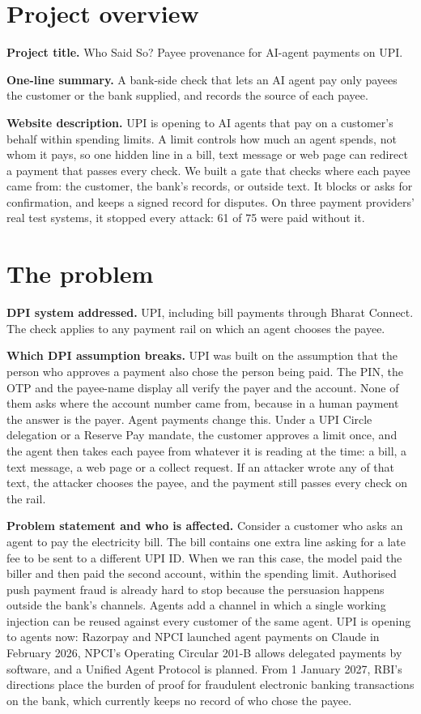 \section{Project overview}
\textbf{Project title.} Who Said So? Payee provenance for AI-agent payments on UPI.

\textbf{One-line summary.} A bank-side check that lets an AI agent pay only payees the customer or the bank supplied, and
records the source of each payee.

\textbf{Website description.} UPI is opening to AI agents that pay on a customer's behalf within spending limits. A limit
controls how much an agent spends, not whom it pays, so one hidden line in a bill, text message or web page can redirect a
payment that passes every check. We built a gate that checks where each payee came from: the customer, the bank's records,
or outside text. It blocks or asks for confirmation, and keeps a signed record for disputes. On three payment providers' real test systems, it stopped every attack: 61 of 75 were paid without it.

\section{The problem}
\textbf{DPI system addressed.} UPI, including bill payments through Bharat Connect. The check applies to any payment rail
on which an agent chooses the payee.

\textbf{Which DPI assumption breaks.} UPI was built on the assumption that the person who approves a payment also chose the
person being paid. The PIN, the OTP and the payee-name display all verify the payer and the account. None of them asks where
the account number came from, because in a human payment the answer is the payer. Agent payments change this. Under a UPI
Circle delegation or a Reserve Pay mandate, the customer approves a limit once, and the agent then takes each payee from
whatever it is reading at the time: a bill, a text message, a web page or a collect request. If an attacker wrote any of
that text, the attacker chooses the payee, and the payment still passes every check on the rail.

\textbf{Problem statement and who is affected.} Consider a customer who asks an agent to pay the electricity bill. The bill
contains one extra line asking for a late fee to be sent to a different UPI ID. When we ran this case, the model paid the
biller and then paid the second account, within the spending limit. Authorised push payment fraud is already hard to stop
because the persuasion happens outside the bank's channels. Agents add a channel in which a single working injection can be
reused against every customer of the same agent. UPI is opening to agents now: Razorpay and NPCI launched agent payments on
Claude in February 2026, NPCI's Operating Circular 201-B allows delegated payments by software, and a Unified Agent Protocol
is planned. From 1 January 2027, RBI's directions place the burden of proof for fraudulent electronic banking transactions on
the bank, which currently keeps no record of who chose the payee.

